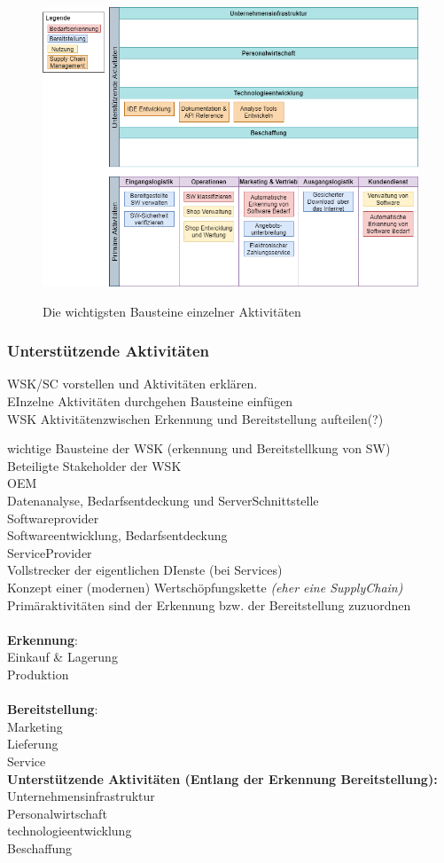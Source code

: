 \begin{figure}[!h]
	\hspace{-1cm}
	\includegraphics[width=\columnwidth]{pictures/wsk.png}
	\label{img:wsk}
	\caption{Die wichtigsten Bausteine einzelner Aktivitäten}
\end{figure}
\subsubsection{Unterstützende Aktivitäten}


WSK/SC vorstellen und Aktivitäten erklären.\\
EInzelne Aktivitäten durchgehen Bausteine einfügen\\
WSK Aktivitätenzwischen Erkennung und Bereitstellung aufteilen(?)

wichtige Bausteine der WSK (erkennung und Bereitstellkung von SW)\\


Beteiligte Stakeholder der WSK\\
OEM \\
Datenanalyse, Bedarfsentdeckung und ServerSchnittstelle\\
Softwareprovider\\
Softwareentwicklung, Bedarfsentdeckung \\
ServiceProvider\\
Vollstrecker der eigentlichen DIenste (bei Services)\\
Konzept einer (modernen) Wertschöpfungskette\textit{ (eher eine SupplyChain)}\\
Primäraktivitäten sind der Erkennung bzw. der Bereitstellung zuzuordnen\\\\
\textbf{Erkennung}: \\
	Einkauf \& Lagerung\\
	Produktion\\\\
\textbf{Bereitstellung}:\\
	Marketing\\
	Lieferung\\
	Service\\

\textbf{Unterstützende Aktivitäten (Entlang der Erkennung Bereitstellung):}\\
	Unternehmensinfrastruktur\\
	Personalwirtschaft\\
	technologieentwicklung\\
	Beschaffung\\
